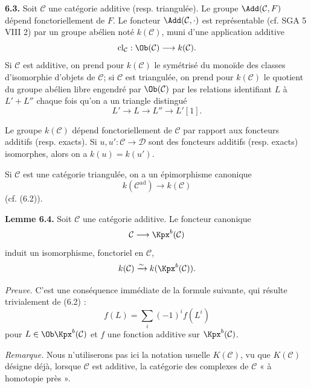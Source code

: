 \documentclass[11pt]{article}
\newcommand{\cl}{\operatorname{cl}}
\begin{document}
\textbf{6.3.} Soit \(\mathcal C\) une catégorie additive (resp. triangulée). Le groupe \(\Add(\mathcal C,F)\) dépend fonctoriellement de \(F\). Le foncteur \(\Add(\mathcal C,\cdot)\) est représentable (cf. SGA 5 VIII 2) par un groupe abélien noté \(k(\mathcal C)\), muni d'une application additive
\[
  \cl_{\mathcal C}:\Ob(\mathcal C)\longrightarrow k(\mathcal C).
\]
Si \(\mathcal C\) est additive, on prend pour \(k(\mathcal C)\) le symétrisé du monoïde des classes d'isomorphie d'objets de \(\mathcal C\); si \(\mathcal C\) est triangulée, on prend pour \(k(\mathcal C)\) le quotient du groupe abélien libre engendré par \(\Ob(\mathcal C)\) par les relations identifiant \(L\) à \(L'+L''\) chaque fois qu'on a un triangle distingué
\[
  L'\longrightarrow L\longrightarrow L''\longrightarrow L'[1].
\]

Le groupe \(k(\mathcal C)\) dépend fonctoriellement de \(\mathcal C\) par rapport aux foncteurs additifs (resp. exacts). Si \(u,u':\mathcal C\to\mathcal D\) sont des foncteurs additifs (resp. exacts) isomorphes, alors on a \(k(u)=k(u')\).

Si \(\mathcal C\) est une catégorie triangulée, on a un épimorphisme canonique
\[
  k(\mathcal C^{\mathrm{ad}})\longrightarrow k(\mathcal C)
\]
(cf. (6.2)).

\textbf{Lemme 6.4.} Soit \(\mathcal C\) une catégorie additive. Le foncteur canonique
\[
  \mathcal C\longrightarrow \Kpx^b(\mathcal C)
\]
induit un isomorphisme, fonctoriel en \(\mathcal C\),
\[
  k(\mathcal C)\xrightarrow{\sim} k(\Kpx^b(\mathcal C)).
\]

\emph{Preuve.} C'est une conséquence immédiate de la formule suivante, qui résulte trivialement de (6.2) :
\begin{equation}\tag{6.4.1}
  f(L)=\sum_i (-1)^i f(L^i)
\end{equation}
pour \(L\in\Ob\Kpx^b(\mathcal C)\) et \(f\) une fonction additive sur \(\Kpx^b(\mathcal C)\).

\emph{Remarque.} Nous n'utiliserons pas ici la notation usuelle \(K(\mathcal C)\), vu que \(K(\mathcal C)\) désigne déjà, lorsque \(\mathcal C\) est additive, la catégorie des complexes de \(\mathcal C\) « à homotopie près ».
\end{document}
